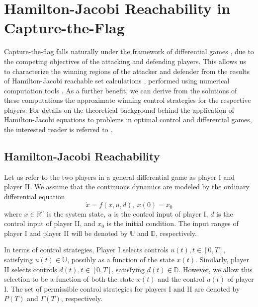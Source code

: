 \documentclass[letterpaper, 10 pt, conference]{ieeeconf}  %
\numberwithin{algorithm}{section}
\begin{document}
\section{Hamilton-Jacobi Reachability in Capture-the-Flag}
\label{sec:hj_formulation}
Capture-the-flag falls naturally under the framework of differential games \cite{b:isaacs-1967}, due to the competing objectives of the attacking and defending players.  This allows us to characterize the winning regions of the attacker and defender from the results of Hamilton-Jacobi reachable set calculations \cite{j:mitchell-TAC-2005}, performed using numerical computation tools \cite{j:mitchell-jsc-2008}.  As a further benefit, we can derive from the solutions of these computations the approximate winning control strategies for the respective players.  For details on the theoretical background behind the application of Hamilton-Jacobi equations to problems in optimal control and differential games, the interested reader is referred to \cite{j:Evans-IUMJ-1984,b:bardi-1997}. 

\subsection{Hamilton-Jacobi Reachability}
\label{subsec:hj_background}
Let us refer to the two players in a general differential game as player I and player II.  We assume that the continuous dynamics are modeled by the ordinary differential equation 
\begin{equation}
\label{eq:dynamics}
\dot{x} = f(x, u, d), \ x(0) = x_0
\end{equation}
where $x \in \mathbb{R}^n$ is the system state,  $u$ is the control input of player I, $d$ is the control input of player II, and $x_0$ is the initial condition.  The input ranges of player I and player II will be denoted by $\mathbb{U}$ and $\mathbb{D}$, respectively.  

In terms of control strategies, Player I selects controls $u(t), t \in [0,T]$, satisfying $u(t) \in \mathbb{U}$, possibly as a function of the state $x(t)$.  Similarly, player II selects controls $d(t), t \in [0,T]$, satisfying $d(t) \in \mathbb{D}$.  However, we allow this selection to be a function of both the state $x(t)$
and the control $u(t)$ of player I.  The set of permissible control strategies for players I and II are denoted by $P(T)$ and $\Gamma(T)$, respectively.
\end{document}
